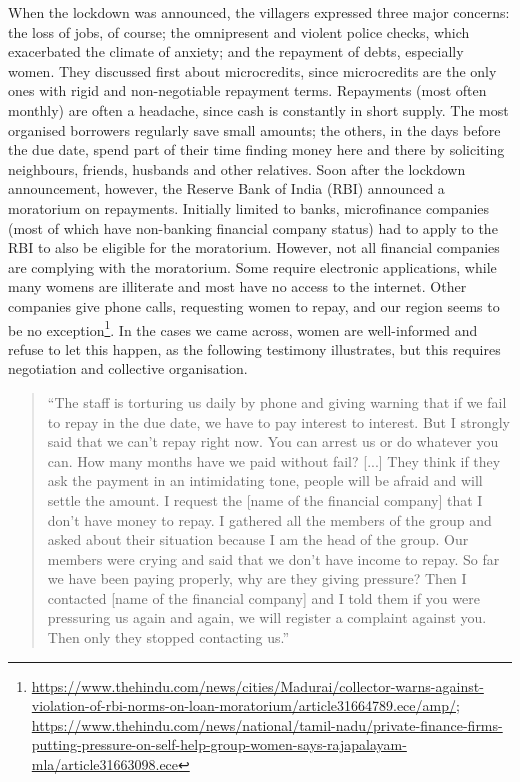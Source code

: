 \documentclass[a4paper, 11pt, onecolumn]{article}
\begin{document}
When the lockdown was announced, the villagers expressed three major concerns: the loss of jobs, of course; the omnipresent and violent police checks, which exacerbated the climate of anxiety; and the repayment of debts, especially women. They discussed first about microcredits, since microcredits are the only ones with rigid and non-negotiable repayment terms. Repayments (most often monthly) are often a headache, since cash is constantly in short supply. The most organised borrowers regularly save small amounts; the others, in the days before the due date, spend part of their time finding money here and there by soliciting neighbours, friends, husbands and other relatives. Soon after the lockdown announcement, however, the Reserve Bank of India (RBI) announced a moratorium on repayments. Initially limited to banks, microfinance companies (most of which have non-banking financial company status) had to apply to the RBI to also be eligible for the moratorium. However, not all financial companies are complying with the moratorium. Some require electronic applications, while many womens are illiterate and most have no access to the internet. Other companies give phone calls, requesting women to repay, and our region seems to be no exception\footnote{\url{https://www.thehindu.com/news/cities/Madurai/collector-warns-against-violation-of-rbi-norms-on-loan-moratorium/article31664789.ece/amp/}; \url{https://www.thehindu.com/news/national/tamil-nadu/private-finance-firms-putting-pressure-on-self-help-group-women-says-rajapalayam-mla/article31663098.ece}}.  In the cases we came across, women are well-informed and refuse to let this happen, as the following testimony illustrates, but this requires negotiation and collective organisation. 

\begin{quote}
“The staff is torturing us daily by phone and giving warning that if we fail to repay in the due date, we have to pay interest to interest. But I strongly said that we can’t repay right now. You can arrest us or do whatever you can. How many months have we paid without fail? [...] They think if they ask the payment in an intimidating tone, people will be afraid and will settle the amount. I request the [name of the financial company] that I don’t have money to repay. I gathered all the members of the group and asked about their situation because I am the head of the group. Our members were crying and said that we don’t have income to repay. So far we have been paying properly, why are they giving pressure? Then I contacted [name of the financial company] and I told them if you were pressuring us again and again, we will register a complaint against you. Then only they stopped contacting us.”
\end{quote}
\end{document}
